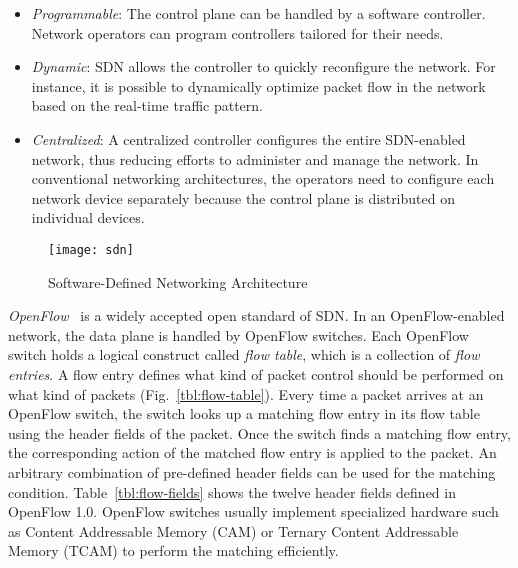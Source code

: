 \begin{itemize}
\item
  \emph{Programmable}: The control plane can be handled by a software
  controller. Network operators can program controllers tailored for
  their needs.
\item
  \emph{Dynamic}: SDN allows the controller to quickly reconfigure the
  network. For instance, it is possible to dynamically optimize packet
  flow in the network based on the real-time traffic pattern.
\item
  \emph{Centralized}: A centralized controller configures the entire
  SDN-enabled network, thus reducing efforts to administer and manage
  the network. In conventional networking architectures, the operators
  need to configure each network device separately because the control
  plane is distributed on individual devices.
\end{itemize}

\begin{figure}
    \centering
    \texttt{[image: sdn]}
    \caption{Software-Defined Networking Architecture}%
    \label{fig:sdn-architecture}
\end{figure}

\emph{OpenFlow}~\autocite{McKeown2008} is a widely accepted open standard of
SDN\@. In an OpenFlow-enabled network, the data plane is handled by OpenFlow
switches. Each OpenFlow switch holds a logical construct called \emph{flow
table}, which is a collection of \emph{flow entries}. A flow entry defines
what kind of packet control should be performed on what kind of packets
(Fig.~\ref{tbl:flow-table}). Every time a packet arrives at an OpenFlow
switch, the switch looks up a matching flow entry in its flow table using the
header fields of the packet. Once the switch finds a matching flow entry, the
corresponding action of the matched flow entry is applied to the packet. An
arbitrary combination of pre-defined header fields can be used for the
matching condition. Table~\ref{tbl:flow-fields} shows the twelve header fields
defined in OpenFlow 1.0. OpenFlow switches usually implement specialized
hardware such as Content Addressable Memory (CAM) or Ternary Content
Addressable Memory (TCAM) to perform the matching efficiently.

